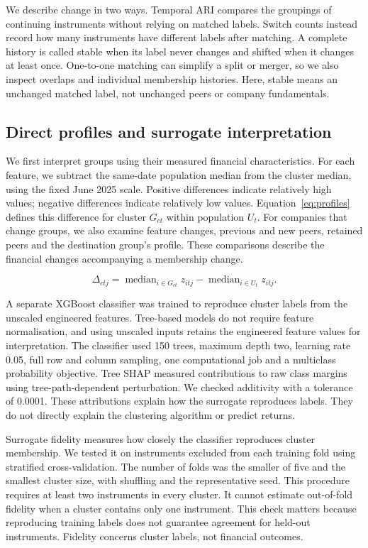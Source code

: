 We describe change in two ways. Temporal ARI compares the groupings of continuing instruments without relying on matched labels. Switch counts instead record how many instruments have different labels after matching. A complete history is called stable when its label never changes and shifted when it changes at least once. One-to-one matching can simplify a split or merger, so we also inspect overlaps and individual membership histories. Here, stable means an unchanged matched label, not unchanged peers or company fundamentals.


\subsection{Direct profiles and surrogate interpretation}

We first interpret groups using their measured financial characteristics. For each feature, we subtract the same-date population median from the cluster median, using the fixed June 2025 scale. Positive differences indicate relatively high values; negative differences indicate relatively low values. Equation~\ref{eq:profiles} defines this difference for cluster $G_{ct}$ within population $U_t$. For companies that change groups, we also examine feature changes, previous and new peers, retained peers and the destination group's profile. These comparisons describe the financial changes accompanying a membership change.


\begin{equation}
\Delta_{ctj}=\operatorname{median}_{i\in G_{ct}}z_{itj}-\operatorname{median}_{i\in U_t}z_{itj}.
\label{eq:profiles}\end{equation}

A separate XGBoost classifier was trained to reproduce cluster labels from the unscaled engineered features. Tree-based models do not require feature normalisation, and using unscaled inputs retains the engineered feature values for interpretation. The classifier used 150 trees, maximum depth two, learning rate 0.05, full row and column sampling, one computational job and a multiclass probability objective. Tree SHAP measured contributions to raw class margins using tree-path-dependent perturbation. We checked additivity with a tolerance of 0.0001. These attributions explain how the surrogate reproduces labels. They do not directly explain the clustering algorithm or predict returns.


Surrogate fidelity measures how closely the classifier reproduces cluster membership. We tested it on instruments excluded from each training fold using stratified cross-validation. The number of folds was the smaller of five and the smallest cluster size, with shuffling and the representative seed. This procedure requires at least two instruments in every cluster. It cannot estimate out-of-fold fidelity when a cluster contains only one instrument. This check matters because reproducing training labels does not guarantee agreement for held-out instruments. Fidelity concerns cluster labels, not financial outcomes.


